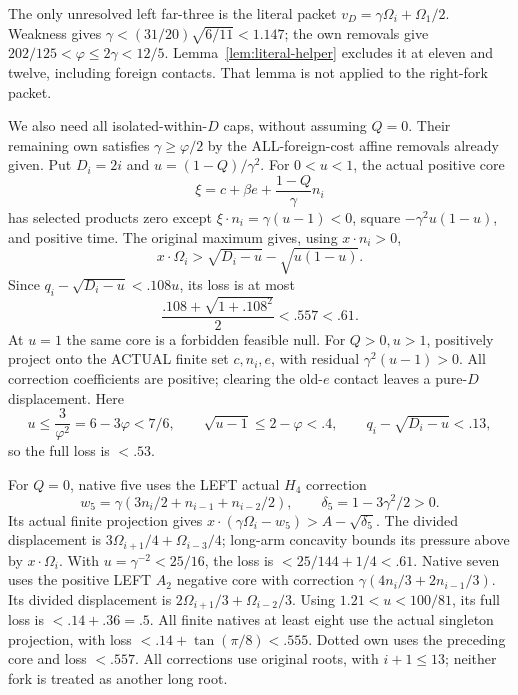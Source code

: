 \documentclass[11pt]{article}
\begin{document}
The only unresolved left far-three is the literal packet
\(v_D=\gamma\Omega_i+\Omega_1/2\).
Weakness gives \(\gamma<(31/20)\sqrt{6/11}<1.147\);
the own removals give
\(202/125<\varphi\le2\gamma<12/5\).
Lemma~\ref{lem:literal-helper} excludes it at eleven
and twelve, including foreign contacts.
That lemma is not applied to the right-fork packet.

We also need all isolated-within-\(D\) caps, without
assuming \(Q=0\).
Their remaining own satisfies \(\gamma\ge\varphi/2\)
by the ALL-foreign-cost affine removals already given.
Put \(D_i=2i\) and \(u=(1-Q)/\gamma^2\).
For \(0<u<1\), the actual positive core
\[
 \xi=c+\beta e+{\frac{1-Q}{\gamma}}n_i
\]
has selected products zero except
\(\xi\cdot n_i=\gamma(u-1)<0\), square
\(-\gamma^2u(1-u)\), and positive time.
The original maximum gives, using \(x\cdot n_i>0\),
\[
 x\cdot\Omega_i>
       \sqrt{D_i-u}-\sqrt{u(1-u)} .
\]
Since \(q_i-\sqrt{D_i-u}<.108u\), its loss is at most
\[
                {\frac{.108+\sqrt{1+.108^2}}{2}}<.557<.61 .
\]
At \(u=1\) the same core is a forbidden feasible null.
For \(Q>0,u>1\), positively project onto the ACTUAL
finite set \(c,n_i,e\), with residual
\(\gamma^2(u-1)>0\).
All correction coefficients are positive; clearing the
old-\(e\) contact leaves a pure-\(D\) displacement.
Here
\[
 u\le{\frac{3}{\varphi^2}}=6-3\varphi<7/6,\qquad
 \sqrt{u-1}\le2-\varphi<.4,\qquad
 q_i-\sqrt{D_i-u}<.13 ,
\]
so the full loss is \(<.53\).

For \(Q=0\), native five uses the LEFT actual \(H_4\)
correction
\[
 w_5=\gamma(3n_i/2+n_{i-1}+n_{i-2}/2),\qquad
 \delta_5=1-3\gamma^2/2>0 .
\]
Its actual finite projection gives
\(x\cdot(\gamma\Omega_i-w_5)>A-\sqrt{\delta_5}\).
The divided displacement is
\(3\Omega_{i+1}/4+\Omega_{i-3}/4\);
long-arm concavity bounds its pressure above by
\(x\cdot\Omega_i\).
With \(u=\gamma^{-2}<25/16\), the loss is
\(<25/144+1/4<.61\).
Native seven uses the positive LEFT \(A_2\) negative
core with correction
\(\gamma(4n_i/3+2n_{i-1}/3)\).
Its divided displacement is
\(2\Omega_{i+1}/3+\Omega_{i-2}/3\).
Using \(1.21<u<100/81\), its full loss is
\(<.14+.36=.5\).
All finite natives at least eight use the actual singleton
projection, with loss
\(<.14+\tan(\pi/8)<.555\).
Dotted own uses the preceding core and loss \(<.557\).
All corrections use original roots, with \(i+1\le13\);
neither fork is treated as another long root.
\end{document}
